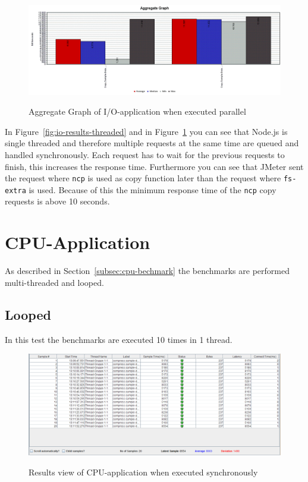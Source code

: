 \begin{figure}[!h]
  \caption{Aggregate Graph of I/O-application when executed parallel}
  \centering
    \includegraphics[width=1\textwidth]{Screenshots/io-graph-threaded}
	\label{fig:io-graph-threaded}
\end{figure}

In Figure~\ref{fig:io-results-threaded} and in Figure~\ref{fig:io-graph-threaded} you can see that Node.js is single threaded and therefore multiple requests at the same time are queued and handled synchronously. Each request has to wait for the previous requests to finish, this increases the response time. Furthermore you can see that JMeter sent the request where \texttt{ncp} is used as copy function later than the request where \texttt{fs-extra} is used. Because of this the minimum response time of the \texttt{ncp} copy requests is above 10 seconds.

\section{CPU-Application}
As described in Section~\ref{subsec:cpu-bechmark} the benchmarks are performed multi-threaded and looped.

\subsection{Looped}
In this test the benchmarks are executed 10 times in 1 thread. 

\begin{figure}[!h]
  \caption{Results view of CPU-application when executed synchronously}
  \centering
    \includegraphics[width=1\textwidth]{Screenshots/cpu-results-looped}
    \label{fig:cpu-results-looped}
\end{figure}


